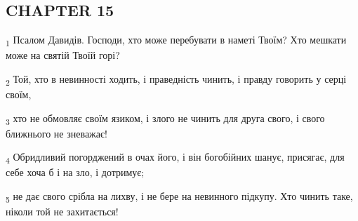 \subsection{CHAPTER 15}
\begin{tcolorbox}
\textsubscript{1} Псалом Давидів. Господи, хто може перебувати в наметі Твоїм? Хто мешкати може на святій Твоїй горі?
\end{tcolorbox}
\begin{tcolorbox}
\textsubscript{2} Той, хто в невинності ходить, і праведність чинить, і правду говорить у серці своїм,
\end{tcolorbox}
\begin{tcolorbox}
\textsubscript{3} хто не обмовляє своїм язиком, і злого не чинить для друга свого, і свого ближнього не зневажає!
\end{tcolorbox}
\begin{tcolorbox}
\textsubscript{4} Обридливий погорджений в очах його, і він богобійних шанує, присягає, для себе хоча б і на зло, і дотримує;
\end{tcolorbox}
\begin{tcolorbox}
\textsubscript{5} не дає свого срібла на лихву, і не бере на невинного підкупу. Хто чинить таке, ніколи той не захитається!
\end{tcolorbox}

